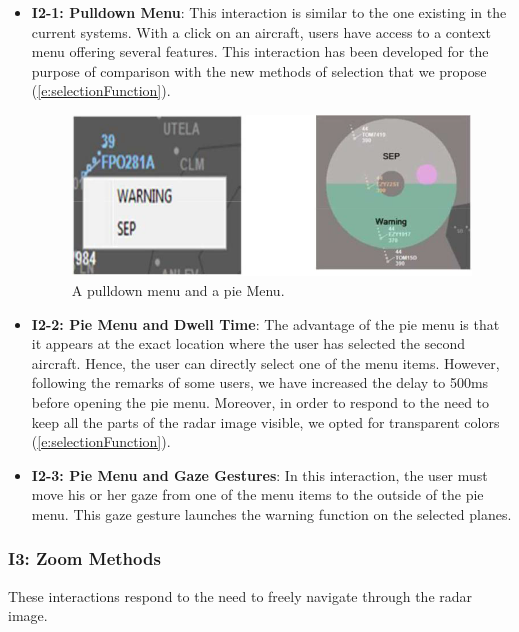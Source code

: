 \begin{itemize}

\item \textbf{I2-1: Pulldown Menu}: This interaction is similar to the one existing in the current
systems. With a click on an aircraft, users have access to a
context menu offering several features. This interaction has
been developed for the purpose of comparison with the new
methods of selection that we propose (\autoref{e:selectionFunction}).
\begin{figure}
 \centering
	\includegraphics[width=\textwidth]{Figures/selectionFunction.png}
	\caption{
	A pulldown menu and a pie Menu.}
	\label{e:selectionFunction}
\end{figure}

\item \textbf{I2-2: Pie Menu and Dwell Time}: The advantage of the pie menu is that it appears at the exact
location where the user has selected the second aircraft.
Hence, the user can directly select one of the menu items.
However, following the remarks of some users, we have
increased the delay to 500ms before opening the pie menu.
Moreover, in order to respond to the need to keep all the
parts of the radar image visible, we opted for transparent
colors (\autoref{e:selectionFunction}).

\item  \textbf{I2-3: Pie Menu and Gaze Gestures}: In this interaction, the user must move his or her gaze from one of the menu items to the outside of the pie menu. This gaze gesture launches the warning function on the selected planes.

\end{itemize}
 
\subsubsection{I3: Zoom Methods}
These interactions respond to the need to freely navigate
through the radar image.

